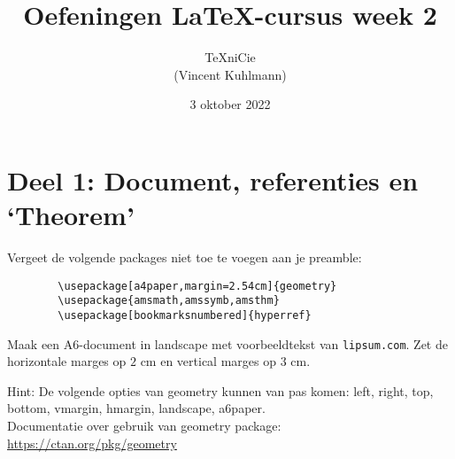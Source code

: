 \documentclass[a4paper]{article}
\title{Oefeningen \LaTeX-cursus week 2}
\author{\TeX niCie\\(Vincent Kuhlmann)}
\date{3 oktober 2022}
\begin{document}
    \maketitle


    \section{Deel 1: Document, referenties en `Theorem'}
    Vergeet de volgende packages niet toe te voegen aan je preamble:
    \begin{verbatim}
        \usepackage[a4paper,margin=2.54cm]{geometry}
        \usepackage{amsmath,amssymb,amsthm}
        \usepackage[bookmarksnumbered]{hyperref}
    \end{verbatim}
    \bigskip

    \begin{exercise}[Geometry]\label{ex:aaaa}
        Maak een A6-document in landscape met voorbeeldtekst van \nolinkurl{lipsum.com}. Zet de
        horizontale marges op $ 2\text{ cm} $ en vertical marges op $ 3\text{ cm} $.

        Hint: De volgende opties van geometry kunnen van pas komen: left, right, top, bottom,
        vmargin, hmargin, landscape, a6paper.\\
        Documentatie over gebruik van geometry package: \url{https://ctan.org/pkg/geometry}
    \end{exercise}

\end{document}
